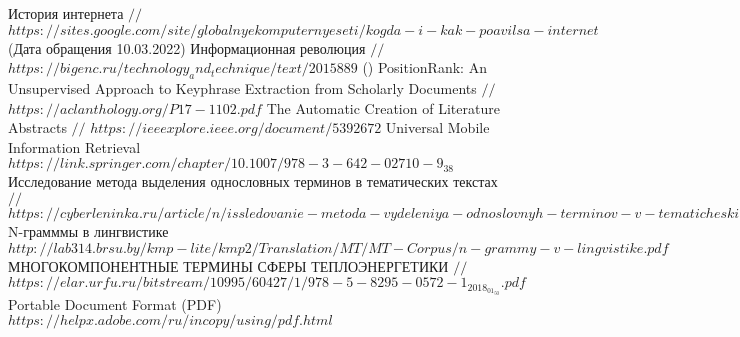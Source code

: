 \begin{thebibliography}{}
История интернета $//$ $https://sites.google.com/site/globalnyekomputernyeseti/kogda-i-kak-poavilsa-internet$ (Дата обращения 10.03.2022)
Информационная революция $//$ $https://bigenc.ru/technology_and_technique/text/2015889$ ()
PositionRank: An Unsupervised Approach to Keyphrase Extraction
from Scholarly Documents $//$
$https://aclanthology.org/P17-1102.pdf$
The Automatic Creation of Literature Abstracts $//$
$https://ieeexplore.ieee.org/document/5392672$
Universal Mobile Information Retrieval
$https://link.springer.com/chapter/10.1007/978-3-642-02710-9_38$
Исследование метода выделения однословных терминов в тематических текстах $//$
$https://cyberleninka.ru/article/n/issledovanie-metoda-vydeleniya-odnoslovnyh-terminov-v-tematicheskih-tekstah/viewer$	
N-грамммы в лингвистике
$http://lab314.brsu.by/kmp-lite/kmp2/Translation/MT/MT-Corpus/n-grammy-v-lingvistike.pdf$
МНОГОКОМПОНЕНТНЫЕ ТЕРМИНЫ СФЕРЫ ТЕПЛОЭНЕРГЕТИКИ $//$
$https://elar.urfu.ru/bitstream/10995/60427/1/978-5-8295-0572-1_2018_01_50.pdf$
Portable Document Format (PDF)
$https://helpx.adobe.com/ru/incopy/using/pdf.html$
\end{thebibliography}
\endgroup